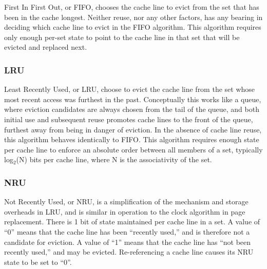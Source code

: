 First In First Out, or FIFO, chooses the cache line to evict from the set that has been in the cache longest.  Neither reuse, nor any other factors, has any bearing in deciding which cache line to evict in the FIFO algorithm.  This algorithm requires only enough per-set state to point to the cache line in that set that will be evicted and replaced next.
\subsubsection{LRU}

Least Recently Used, or LRU, choose to evict the cache line from the set whose most recent access was furthest in the past.  Conceptually this works like a queue, where eviction candidates are always chosen from the tail of the queue, and both initial use and subsequent reuse promotes cache lines to the front of the queue, furthest away from being in danger of eviction. In the absence of cache line reuse, this algorithm behaves identically to FIFO.  This algorithm requires enough state per cache line to enforce an absolute order between all members of a set, typically log$_2$(N) bits per cache line, where N is the associativity of the set.



\subsubsection{NRU}

Not Recently Used, or NRU, is a simplification of the mechanism and storage overheads in LRU, and is similar in operation to the clock algorithm in page replacement.  There is 1 bit of state maintained per cache line in a set.  A value of ``0'' means that the cache line has been ``recently used,'' and is therefore not a candidate for eviction.  A value of ``1'' means that the cache line has ``not been recently used,'' and may be evicted.  Re-referencing a cache line causes its NRU state to be set to ``0''.

